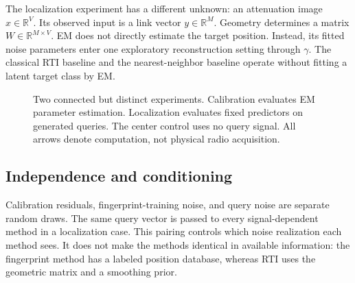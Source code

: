 \documentclass[conference,letterpaper]{IEEEtran}
\newcommand{\R}{\mathbb{R}}
\begin{document}
The localization experiment has a different unknown: an attenuation image $x\in\R^V$. Its observed input is a link vector $y\in\R^M$. Geometry determines a matrix $W\in\R^{M\times V}$. EM does not directly estimate the target position. Instead, its fitted noise parameters enter one exploratory reconstruction setting through $\gamma$. The classical RTI baseline and the nearest-neighbor baseline operate without fitting a latent target class by EM.

\begin{figure}[t]
\centering
{}
\caption{Two connected but distinct experiments. Calibration evaluates EM parameter estimation. Localization evaluates fixed predictors on generated queries. The center control uses no query signal. All arrows denote computation, not physical radio acquisition.}
\label{fig:flow}
\end{figure}

\subsection{Independence and conditioning}
Calibration residuals, fingerprint-training noise, and query noise are separate random draws. The same query vector is passed to every signal-dependent method in a localization case. This pairing controls which noise realization each method sees. It does not make the methods identical in available information: the fingerprint method has a labeled position database, whereas RTI uses the geometric matrix and a smoothing prior.
\end{document}

